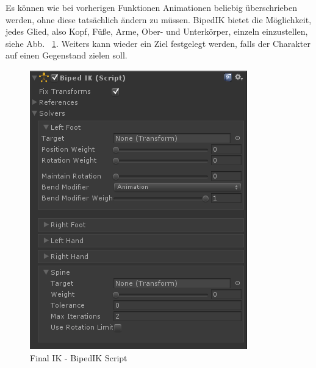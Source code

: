 \begin{itemize}
Es können wie bei vorherigen Funktionen Animationen beliebig überschrieben werden, ohne diese tatsächlich ändern zu müssen.
BipedIK bietet die Möglichkeit, jedes Glied, also Kopf, Füße, Arme, Ober- und Unterkörper, einzeln einzustellen, siehe Abb. ~\ref{fig:finalIK_bipedik_script}.
Weiters kann wieder ein Ziel festgelegt werden, falls der Charakter auf einen Gegenstand zielen soll.
\begin {figure}
    \centering
    \includegraphics[scale=0.8]{pics/finalik_bipedik_script}
    \caption{Final IK - BipedIK Script}
    \label{fig:finalIK_bipedik_script}
\end {figure}
~\cite{FinalIK_BipedIK_2021}


\end{itemize}
